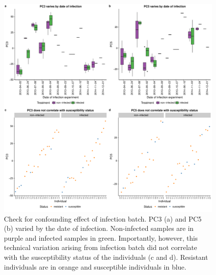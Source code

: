 \documentclass[fleqn,10pt]{wlscirep}
\begin{document}
\begin{figure}[ht]
\centering
\includegraphics[width=\linewidth]{../figure/batch-infection.pdf}
\caption{
Check for confounding effect of infection batch. PC3 (a) and PC5 (b)
varied by the date of infection. Non-infected samples are in purple
and infected samples in green. Importantly, however, this technical
variation arising from infection batch did not correlate with the
susceptibility status of the individuals (c and d). Resistant
individuals are in orange and susceptible individuals in blue.
}
\label{fig:infection}
\end{figure}
\end{document}
